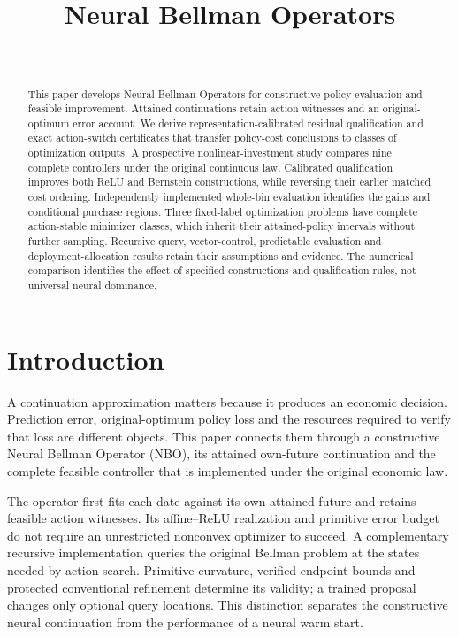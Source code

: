 \documentclass[ecta,nameyear,draft]{econsocart}
\begin{document}
\begin{frontmatter}
\title{Neural Bellman Operators}
\begin{aug}
\author[id=au1,addressref={add1}]{~}
\address[id=add1]{Peking University}
\end{aug}
\begin{abstract}
This paper develops Neural Bellman Operators for constructive policy evaluation and feasible improvement. Attained continuations retain action witnesses and an original-optimum error account. We derive representation-calibrated residual qualification and exact action-switch certificates that transfer policy-cost conclusions to classes of optimization outputs. A prospective nonlinear-investment study compares nine complete controllers under the original continuous law. Calibrated qualification improves both ReLU and Bernstein constructions, while reversing their earlier matched cost ordering. Independently implemented whole-bin evaluation identifies the gains and conditional purchase regions. Three fixed-label optimization problems have complete action-stable minimizer classes, which inherit their attained-policy intervals without further sampling. Recursive query, vector-control, predictable evaluation and deployment-allocation results retain their assumptions and evidence. The numerical comparison identifies the effect of specified constructions and qualification rules, not universal neural dominance.
\end{abstract}
\begin{keyword}
\end{keyword}
\end{frontmatter}
\section{Introduction}\label{sec:introduction65}
A continuation approximation matters because it produces an economic decision. Prediction error, original-optimum policy loss and the resources required to verify that loss are different objects. This paper connects them through a constructive Neural Bellman Operator (NBO), its attained own-future continuation and the complete feasible controller that is implemented under the original economic law.

The operator first fits each date against its own attained future and retains feasible action witnesses. Its affine--ReLU realization and primitive error budget do not require an unrestricted nonconvex optimizer to succeed. A complementary recursive implementation queries the original Bellman problem at the states needed by action search. Primitive curvature, verified endpoint bounds and protected conventional refinement determine its validity; a trained proposal changes only optional query locations. This distinction separates the constructive neural continuation from the performance of a neural warm start.
\end{document}
